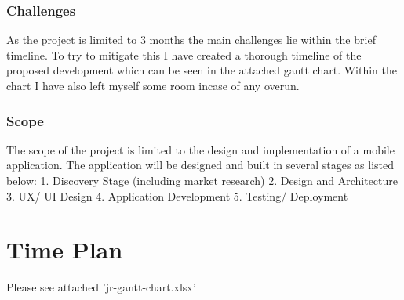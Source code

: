 \documentclass[12pt]{article}
\begin{document}
\subsubsection{Challenges}
As the project is limited to 3 months the main challenges lie within the brief timeline. To try to mitigate this I have created a thorough timeline of the proposed development which can be seen in the attached gantt chart. Within the chart I have also left myself some room incase of any overun. 

\subsubsection{Scope}
The scope of the project is limited to the design and implementation of a mobile application. The application will be designed and built in several stages as listed below:
1. Discovery Stage (including market research)
2. Design and Architecture
3. UX/ UI Design
4. Application Development
5. Testing/ Deployment


\section{Time Plan}
Please see attached 'jr-gantt-chart.xlsx'
\end{document}
